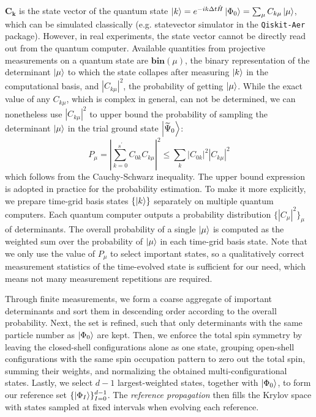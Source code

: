 \documentclass[journal=jctcce,manuscript=article]{achemso}
\begin{document}
$\mathbf{C_{k }}$ is the state vector of the quantum state $\left\vert{k}\right\rangle = e^{-i k \Delta t \hat{H}} \left\vert{\Phi_0}\right\rangle = \sum_{\mu} C_{k \mu} \left\vert{\mu}\right\rangle$, which can be simulated classically (e.g. statevector simulator in the \texttt{Qiskit-Aer}\cite{Qiskit} package). However, in real experiments, the state vector cannot be directly read out from the quantum computer. 
Available quantities from projective measurements on a quantum state are 
$\mathbf{bin}(\mu)$, the binary representation of the determinant $\left\vert{\mu}\right\rangle$ to which the state collapes after measuring $\left\vert{k}\right\rangle$ in the computational basis, 
and $|C_{k \mu}|^2$, the probability of getting $\left\vert{\mu}\right\rangle$.\cite{rieffel2011quantum}
While the exact value of any $C_{k \mu}$, which is complex in general, can not be determined, we can nonetheless use $|C_{k \mu}|^2$ to upper bound the probability of sampling the determinant $\left\vert{\mu}\right\rangle$ in the trial ground state $\left\vert{\widetilde{\Psi}_{0}}\right\rangle$:
\begin{equation}
P_{\mu} =  | \sum_{k=0}^{s^{\prime}}  C_{0 k} C_{k \mu}  |^2   
\leqslant  \sum_{k} |C_{0 k} |^{2}  |C_{k \mu}|^{2} 
\end{equation}
which follows from the Cauchy-Schwarz inequality.
The upper bound expression is adopted in practice for the probability estimation.
To make it more explicitly, we prepare time-grid basis states $\{\left\vert{k}\right\rangle\}$ separately on multiple quantum computers. Each quantum computer outputs a probability distribution $\{|C_{\mu} |^{2}\}_{\mu}$ of determinants. 
The overall probability of a single $\left\vert{\mu}\right\rangle$ is computed as the weighted sum over the probability of $\left\vert{\mu}\right\rangle$ in each time-grid basis state. 
Note that we only use the value of $P_{\mu}$ to select important states, so a qualitatively correct measurement statistics of the time-evolved state is sufficient for our need, which means not many measurement repetitions are required. 

Through finite measurements, we form a coarse aggregate of important determinants and sort them in descending order according to the overall probability. 
Next, the set is refined, such that only determinants with the same particle number as $\left\vert{\Phi_0}\right\rangle$ are kept. 
Then, we enforce the total spin symmetry by leaving the closed-shell configurations alone as one state, grouping open-shell configurations with the same spin occupation pattern to zero out the total spin, summing their weights, and normalizing the obtained multi-configurational states.
Lastly, we select $d-1$ largest-weighted states, together with $\left\vert{\Phi_0}\right\rangle$, to form our reference set $\{ \left\vert{\Phi_{I}}\right\rangle \}_{I=0}^{d-1}$.
The \textit{reference propagation} then fills the Krylov space with states sampled at fixed intervals when evolving each reference.
\end{document}
